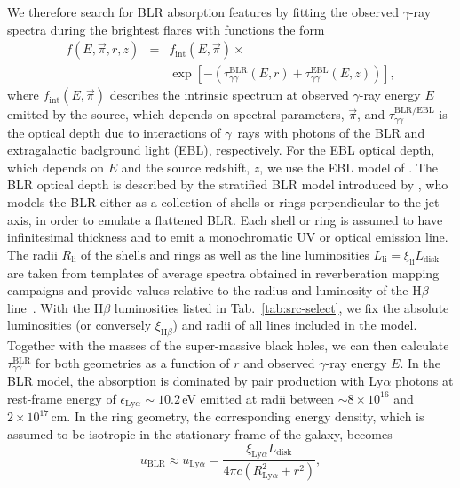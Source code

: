 \documentclass[twocolumn,linenumbers]{aastex62}
\newcommand{\Grays}{$\gamma$~rays\xspace}
\newcommand{\gray}{$\gamma$-ray\xspace}
\begin{document}
We therefore search for BLR absorption features by fitting the observed \gray spectra during the brightest flares with functions the form 
\begin{eqnarray}
    f(E,\vec{\pi},r,z) &=& f_\mathrm{int}(E,\vec{\pi}) \times \nonumber \\ &{}& \exp\left[-\left(\tau_{\gamma\gamma}^\mathrm{BLR}(E,r) +\tau_{\gamma\gamma}^\mathrm{EBL}(E,z) \right)  \right],
\end{eqnarray} 
where $f_\mathrm{int}(E, \vec{\pi})$ describes the intrinsic spectrum at observed \gray energy $E$ emitted by the source, which depends on spectral parameters, $\vec{\pi}$, and $\tau_{\gamma\gamma}^\mathrm{BLR / EBL}$ is the optical depth due to interactions of \Grays with photons of the BLR and extragalactic baclground light (EBL), respectively. 
For the EBL optical depth, which depends on $E$ and the source redshift, $z$, we use the EBL model of \citet{2011MNRAS.410.2556D}.
The BLR optical depth is described by the stratified BLR model introduced by \citet{finke2016}, who models the BLR either as a collection of shells or rings perpendicular to the jet axis, in order to emulate a flattened BLR. 
Each shell or ring is assumed to have infinitesimal thickness and to emit a monochromatic UV or optical emission line. 
The radii $R_\mathrm{li}$ of the shells and rings as well as the line luminosities $L_\mathrm{li} = \xi_\mathrm{li}L_\mathrm{disk}$ are taken from templates of average spectra obtained in reverberation mapping campaigns and provide values relative to the radius and luminosity of the H$\beta$ line~\citep[see][for further details]{finke2016}.
With the H$\beta$ luminosities listed in Tab.~\ref{tab:src-select}, we fix the absolute luminosities (or conversely $\xi_{\mathrm{H}\beta}$) and radii of all lines included in the model.  
Together with the masses of the super-massive black holes, we can then calculate $\tau_{\gamma\gamma}^\mathrm{BLR}$ for both geometries as a function of $r$ and observed \gray energy $E$.
In the BLR model, the absorption is dominated by pair production with Ly$\alpha$ photons at rest-frame energy of $\epsilon_{\mathrm{Ly}\alpha}\sim10.2\,$eV emitted at radii between $\sim 8\times10^{16}$ and $2\times10^{17}$\,cm. 
In the ring geometry, the corresponding energy density, which is assumed to be isotropic in the stationary frame of the galaxy, becomes~\citep{finke2016}
    \begin{equation}
        u_\mathrm{BLR} \approx u_{\mathrm{Ly}\alpha}= \frac{\xi_{\mathrm{Ly}\alpha}L_\mathrm{disk}}{4\pi c(R_{\mathrm{Ly}\alpha}^2 + r^2)},
        \label{eq:u-blr}
    \end{equation}
\end{document}
